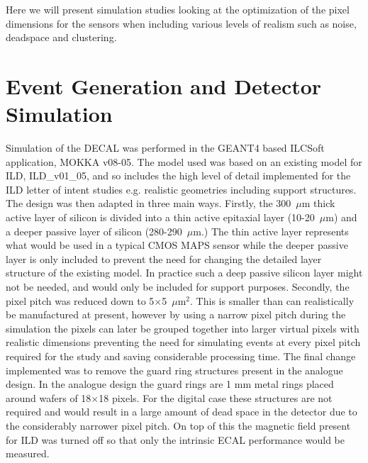 Here we will present simulation studies looking at the optimization of the pixel dimensions for the sensors when including various levels of realism such as noise, deadspace and clustering.  

\section{Event Generation and Detector Simulation}


Simulation of the \ac{DECAL} was performed in the GEANT4 based ILCSoft application, MOKKA v08-05. The model used was based on an existing model for \ac{ILD}, ILD\_v01\_05, and so includes the high level of detail implemented for the \ac{ILD} letter of intent studies\cite{ILD} e.g. realistic geometries including support structures. The design was then adapted in three main ways. Firstly, the 300~$\mu$m thick active layer of silicon is divided into a thin active epitaxial layer (10-20~$\mu$m) and a deeper passive layer of silicon (280-290~$\mu$m.) The thin active layer represents what would be used in a typical \ac{CMOS} \ac{MAPS} sensor while the deeper passive layer is only included to prevent the need for changing the detailed layer structure of the existing model. In practice such a deep passive silicon layer might not be needed, and would only be included for support purposes. Secondly, the pixel pitch was reduced down to 5$\times$5~$\mu$m$^2$. This is smaller than can realistically be manufactured at present, however by using a narrow pixel pitch during the simulation the pixels can later be grouped together into larger virtual pixels with realistic dimensions preventing the need for simulating events at every pixel pitch required for the study and saving considerable processing time. The final change implemented was to remove the guard ring structures present in the analogue design. In the analogue design the guard rings are 1 mm metal rings placed around wafers of 18$\times$18 pixels. For the digital case these structures are not required and would result in a large amount of dead space in the detector due to the considerably narrower pixel pitch. On top of this the magnetic field present for \ac{ILD} was turned off so that only the intrinsic \ac{ECAL} performance would be measured.

